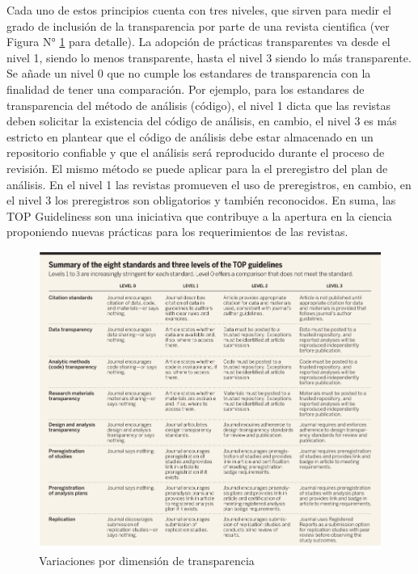 \documentclass[
]{book}
\begin{document}
Cada uno de estos principios cuenta con tres niveles, que sirven para medir el grado de inclusión de la transparencia por parte de una revista cientifica (ver Figura N° \ref{fig:tabtop} para detalle). La adopción de prácticas transparentes va desde el nivel 1, siendo lo menos transparente, hasta el nivel 3 siendo lo más transparente. Se añade un nivel 0 que no cumple los estandares de transparencia con la finalidad de tener una comparación. Por ejemplo, para los estandares de transparencia del método de análisis (código), el nivel 1 dicta que las revistas deben solicitar la existencia del código de análisis, en cambio, el nivel 3 es más estricto en plantear que el código de análisis debe estar almacenado en un repositorio confiable y que el análisis será reproducido durante el proceso de revisión. El mismo método se puede aplicar para la el preregistro del plan de análisis. En el nivel 1 las revistas promueven el uso de preregistros, en cambio, en el nivel 3 los preregistros son obligatorios y también reconocidos. En suma, las TOP Guideliness son una iniciativa que contribuye a la apertura en la ciencia proponiendo nuevas prácticas para los requerimientos de las revistas.

\begin{figure}[H]

{\centering \includegraphics[width=1\linewidth]{docs/images/table_top} 

}

\caption{Variaciones por dimensión de transparencia}\label{fig:tabtop}
\end{figure}
\end{document}

